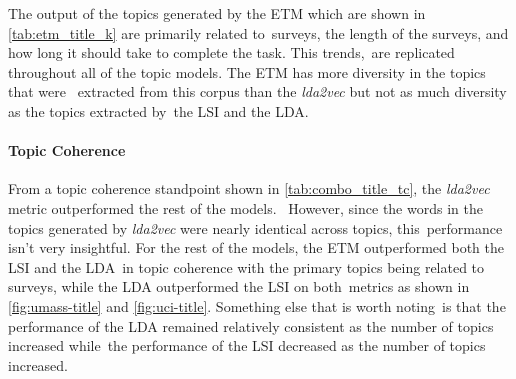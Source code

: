 \documentclass[letterpaper,12pt]{article}
\begin{document}
The output of the topics generated by the ETM which are shown in \ref{tab:etm_title_k} are primarily related to\
surveys, the length of the surveys, and how long it should take to complete the task. This trends,\
are replicated throughout all of the topic models. The ETM has more diversity in the topics that were \
extracted from this corpus than the \emph{lda2vec} but not as much diversity as the topics extracted by\
the LSI and the LDA.

\paragraph{Topic Coherence}
From a topic coherence standpoint shown in \ref{tab:combo_title_tc}, the \emph{lda2vec} metric outperformed the rest of the models. \
However, since the words in the topics generated by \emph{lda2vec} were nearly identical across topics, this\
performance isn't very insightful. For the rest of the models, the ETM outperformed both the LSI and the LDA\
in topic coherence with the primary topics being related to surveys, while the LDA outperformed the LSI on both\
metrics as shown in \ref{fig:umass-title} and \ref{fig:uci-title}. Something else that is worth noting\
is that the performance of the LDA remained relatively consistent as the number of topics increased while\
the performance of the LSI decreased as the number of topics increased.
\end{document}
